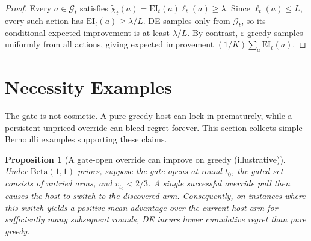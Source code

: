 \documentclass{article}
\newtheorem{proposition} {Proposition}
\newcommand{\Gc}{\mathcal{G}}
\newcommand{\surp}{\ell} %
\newcommand{\delight}{\chi} %
\newcommand{\EI}{\mathrm{EI}} %
\begin{document}
\begin{proof}
Every $a\in\Gc_t$ satisfies
$\tilde{\delight}_t(a)=\EI_t(a)\surp_t(a)\ge\lambda$.
Since $\surp_t(a)\le L$, every such action has $\EI_t(a)\ge\lambda/L$.
DE samples only from $\Gc_t$, so its conditional expected improvement is at least $\lambda/L$.
By contrast, $\varepsilon$-greedy samples uniformly from all actions, giving expected improvement $(1/K)\sum_a\EI_t(a)$.
\end{proof}


\section{Necessity Examples}
\label{app:necessity}

The gate is not cosmetic.
A pure greedy host can lock in prematurely, while a persistent unpriced override can bleed regret forever.
This section collects simple Bernoulli examples supporting these claims.

\begin{proposition}[A gate-open override can improve on greedy (illustrative)]
\label{prop:improvement}
Under $\mathrm{Beta}(1,1)$ priors, suppose the gate opens at round $t_0$, the gated set consists of untried arms, and $v_{t_0} < 2/3$.
A single successful override pull then causes the host to switch to the discovered arm.
Consequently, on instances where this switch yields a positive mean advantage over the current host arm for sufficiently many subsequent rounds, DE incurs lower cumulative regret than pure greedy.
\end{proposition}
\end{document}
